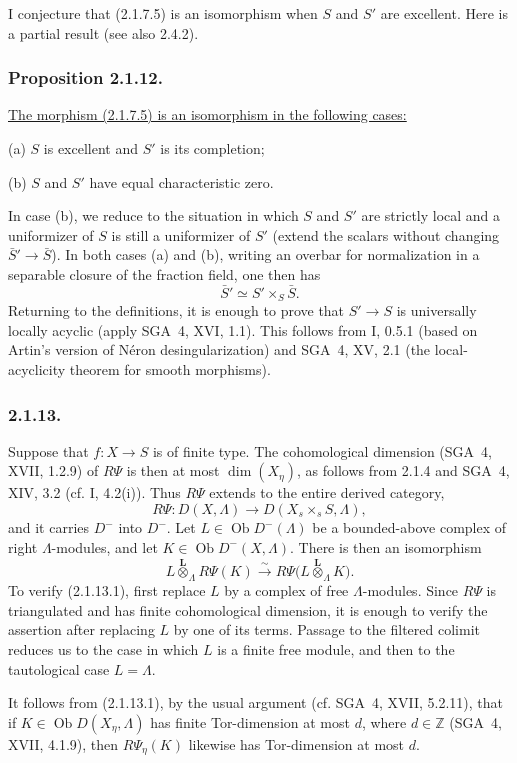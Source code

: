 I conjecture that (2.1.7.5) is an isomorphism when $S$ and $S'$ are
excellent.  Here is a partial result (see also 2.4.2).

\subsubsection*{Proposition 2.1.12.}
\underline{The morphism (2.1.7.5) is an isomorphism in the following
cases:}

\medskip
\noindent(a) $S$ is excellent and $S'$ is its completion;

\noindent(b) $S$ and $S'$ have equal characteristic zero.

In case (b), we reduce to the situation in which $S$ and $S'$ are
strictly local and a uniformizer of $S$ is still a uniformizer of
$S'$ (extend the scalars without changing
$\bar S'\longrightarrow\bar S$).  In both cases (a) and (b), writing
an overbar for normalization in a separable closure of the fraction
field, one then has
\[
\bar S'\simeq S'\times_S\bar S.
\]
Returning to the definitions, it is enough to prove that
$S'\longrightarrow S$ is universally locally acyclic (apply SGA~4,
XVI, 1.1).  This follows from I, 0.5.1 (based on Artin's version of
N\'{e}ron desingularization) and SGA~4, XV, 2.1 (the local-acyclicity
theorem for smooth morphisms).

\subsubsection*{2.1.13.}
Suppose that $f:X\longrightarrow S$ is of finite type.  The
cohomological dimension (SGA~4, XVII, 1.2.9) of $R\Psi$ is then at most
$\dim(X_\eta)$, as follows from 2.1.4 and SGA~4, XIV, 3.2 (cf. I,
4.2(i)).  Thus $R\Psi$ extends to the entire derived category,
\[
R\Psi:D(X,\Lambda)\longrightarrow D(X_s\times_sS,\Lambda),
\]
and it carries $D^-$ into $D^-$.  Let
$L\in\operatorname{Ob}D^-(\Lambda)$ be a bounded-above complex of
right $\Lambda$-modules, and let
$K\in\operatorname{Ob}D^-(X,\Lambda)$.  There is then an isomorphism
\begin{equation}\tag{2.1.13.1}
L\overset{\mathbf L}{\otimes}_\Lambda R\Psi(K)
\xrightarrow{\ \sim\ }
R\Psi\bigl(L\overset{\mathbf L}{\otimes}_\Lambda K\bigr).
\end{equation}
To verify (2.1.13.1), first replace $L$ by a complex of free
$\Lambda$-modules.  Since $R\Psi$ is triangulated and has finite
cohomological dimension, it is enough to verify the assertion after
replacing $L$ by one of its terms.  Passage to the filtered colimit
reduces us to the case in which $L$ is a finite free module, and then
to the tautological case $L=\Lambda$.

It follows from (2.1.13.1), by the usual argument (cf. SGA~4, XVII,
5.2.11), that if $K\in\operatorname{Ob}D(X_\eta,\Lambda)$ has finite
Tor-dimension at most $d$, where $d\in\mathbb Z$ (SGA~4, XVII, 4.1.9),
then $R\Psi_\eta(K)$ likewise has Tor-dimension at most $d$.
